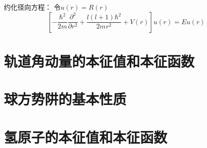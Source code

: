 \documentclass[12pt, a4paper, oneside, UTF8]{ctexbook}
\begin{document}
约化径向方程：
令$u(r) = R(r)$
\begin{equation}
    \left[ -\frac{\hbar^2}{2m}\frac{\partial^2}{\partial r^2} + \frac{l(l+1)\hbar^2}{2mr^2} + V(r) \right] u(r) = Eu(r)
\end{equation}



\section{轨道角动量的本征值和本征函数}


\section{球方势阱的基本性质}
\section{氢原子的本征值和本征函数}



\ifx\allfiles\undefined
\end{document}
